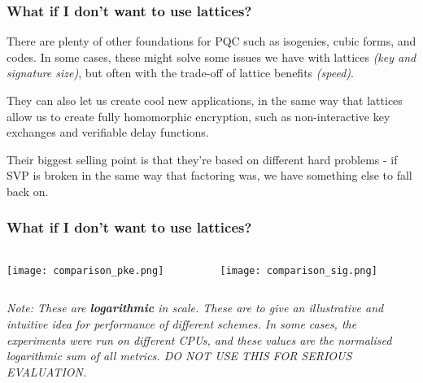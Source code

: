 \documentclass[
aspectratio=169, %
t, %
onlytextwidth, %
10pt, %
]{beamer}
\begin{document}

\begin{frame}
    \frametitle{What if I don't want to use lattices?}

    \begin{adjustwidth}{0cm}{0cm} %
        There are plenty of other foundations for PQC such as isogenies, cubic forms, and codes. In some cases, these might solve some issues we have with lattices \textit{(key and signature size)}, but often with the trade-off of lattice benefits \textit{(speed)}.

        They can also let us create cool new applications, in the same way that lattices allow us to create fully homomorphic encryption, such as non-interactive key exchanges and verifiable delay functions.

        Their biggest selling point is that they're based on different hard problems - if SVP is broken in the same way that factoring was, we have something else to fall back on.
    \end{adjustwidth}
\end{frame}


\begin{frame}
    \frametitle{What if I don't want to use lattices?}
    \begin{columns}[T] %
        \begin{column}{0.5\linewidth} %
            \texttt{[image: comparison\_pke.png]} %
        \end{column}
        \begin{column}{0.5\linewidth} %
            \texttt{[image: comparison\_sig.png]} %
        \end{column}
    \end{columns}
    \textit{Note: These are \textbf{logarithmic} in scale. These are to give an illustrative and intuitive idea for performance of different schemes. In some cases, the experiments were run on different CPUs, and these values are the normalised logarithmic sum of all metrics. DO NOT USE THIS FOR SERIOUS EVALUATION.}
\end{frame}
\end{document}
